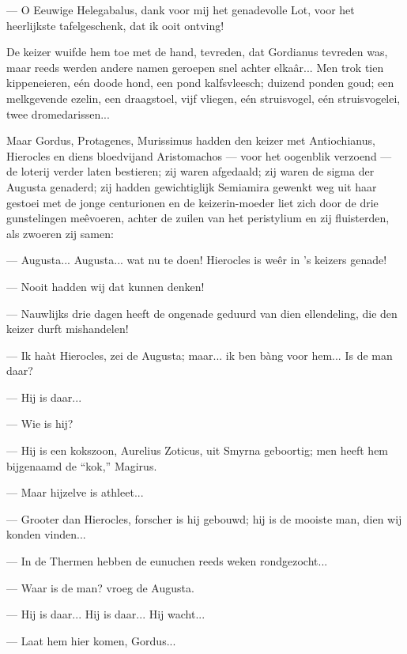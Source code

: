 \documentclass[a4paper, 12pt, oneside, dutch]{article}
\begin{document}
--- O Eeuwige Helegabalus, dank voor mij het genadevolle Lot, voor het heerlijkste tafelgeschenk, dat ik ooit ontving!

De keizer wuifde hem toe met de hand, tevreden, dat Gordianus tevreden was, maar reeds werden andere namen geroepen snel achter elkaâr... Men trok tien kippeneieren, eén doode hond, een pond kalfsvleesch; duizend ponden goud; een melkgevende ezelin, een draagstoel, vijf vliegen, eén struisvogel, eén struisvogelei, twee dromedarissen...

Maar Gordus, Protagenes, Murissimus hadden den keizer met Antiochianus, Hierocles en diens bloedvijand Aristomachos --- voor het oogenblik verzoend --- de loterij verder laten bestieren; zij waren afgedaald; zij waren de sigma der Augusta genaderd; zij hadden gewichtiglijk Semiamira gewenkt weg uit haar gestoei met de jonge centurionen en de keizerin-moeder liet zich door de drie gunstelingen meêvoeren, achter de zuilen van het peristylium en zij fluisterden, als zwoeren zij samen:

--- Augusta... Augusta... wat nu te doen! Hierocles is weêr in 's keizers genade!

--- Nooit hadden wij dat kunnen denken!

--- Nauwlijks drie dagen heeft de ongenade geduurd van dien ellendeling, die den keizer durft mishandelen!

--- Ik haàt Hierocles, zei de Augusta; maar... ik ben bàng voor hem... Is de man daar?

--- Hij is daar...

--- Wie is hij?

--- Hij is een kokszoon, Aurelius Zoticus, uit Smyrna geboortig; men heeft hem bijgenaamd de "`kok,"' Magirus.

--- Maar hijzelve is athleet...

--- Grooter dan Hierocles, forscher is hij gebouwd; hij is de mooiste man, dien wij konden vinden...

--- In de Thermen hebben de eunuchen reeds weken rondgezocht...

--- Waar is de man? vroeg de Augusta.

--- Hij is daar... Hij is daar... Hij wacht...

--- Laat hem hier komen, Gordus...
\end{document}
